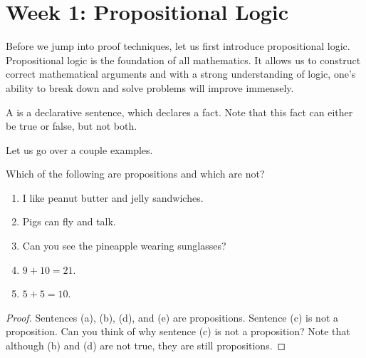 \documentclass[../main.tex]{subfiles}
\begin{document}
\section{Week 1: Propositional Logic}
Before we jump into proof techniques, let us first introduce propositional logic. Propositional logic is the foundation of all mathematics. It allows us to construct correct mathematical arguments and with a strong understanding of logic, one's ability to break down and solve problems will improve immensely. 
\begin{definition}[proposition]
    A  is a declarative sentence, which declares a fact. Note that this fact can either be true or false, but not both. 
\end{definition}
Let us go over a couple examples. 
\begin{example}
    Which of the following are propositions and which are not? 
    \begin{enumerate}[label=(\alph*)]
        \item I like peanut butter and jelly sandwiches. 
        \item Pigs can fly and talk.
        \item Can you see the pineapple wearing sunglasses?
        \item $9 + 10 = 21$.
        \item $5 + 5 = 10$.
    \end{enumerate}
\end{example}
\begin{proof}
    Sentences (a), (b), (d), and (e) are propositions. Sentence (c) is not a proposition. Can you think of why sentence (c) is not a proposition? Note that although (b) and (d) are not true, they are still propositions.
\end{proof}
\end{document}
